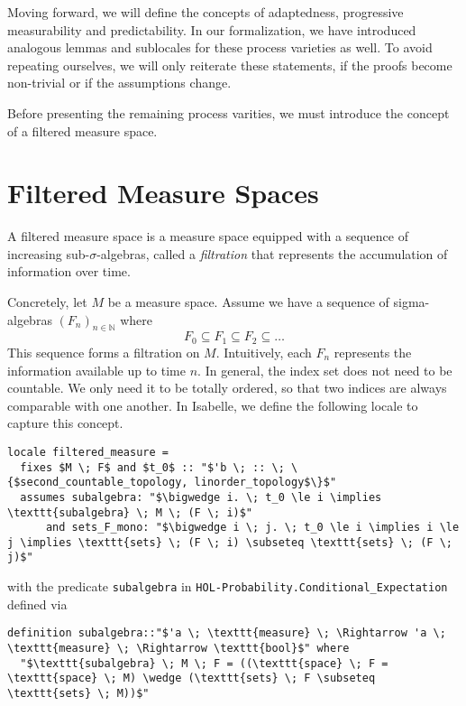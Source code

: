 \begin{remark}
Moving forward, we will define the concepts of adaptedness, progressive measurability and predictability. In our formalization, we have introduced analogous lemmas and sublocales for these process varieties as well. To avoid repeating ourselves, we will only reiterate these statements, if the proofs become non-trivial or if the assumptions change.
\end{remark}

Before presenting the remaining process varities, we must introduce the concept of a filtered measure space.

\section{Filtered Measure Spaces}

A filtered measure space is a measure space equipped with a sequence of increasing sub-$\sigma$-algebras, called a \textit{filtration} that represents the accumulation of information over time.

Concretely, let $M$ be a measure space. Assume we have a sequence of sigma-algebras $(F_n)_{n \in \mathbb{N}}$ where 
\[
	F_0 \subseteq F_1 \subseteq F_2 \subseteq \dots
\]
This sequence forms a filtration on $M$. Intuitively, each $F_n$ represents the information available up to time $n$. In general, the index set does not need to be countable. We only need it to be totally ordered, so that two indices are always comparable with one another. In Isabelle, we define the following locale to capture this concept.

\begin{isadefinition}
{\small
\begin{lstlisting}[style=isabelle]
locale filtered_measure = 
  fixes $M \; F$ and $t_0$ :: "$'b \; :: \; \{$second_countable_topology, linorder_topology$\}$"
  assumes subalgebra: "$\bigwedge i. \; t_0 \le i \implies \texttt{subalgebra} \; M \; (F \; i)$"
      and sets_F_mono: "$\bigwedge i \; j. \; t_0 \le i \implies i \le j \implies \texttt{sets} \; (F \; i) \subseteq \texttt{sets} \; (F \; j)$"
\end{lstlisting}

with the predicate \texttt{subalgebra} in \texttt{HOL-Probability.Conditional\_Expectation} defined via

\begin{lstlisting}[style=isabelle]
definition subalgebra::"$'a \; \texttt{measure} \; \Rightarrow 'a \; \texttt{measure} \; \Rightarrow \texttt{bool}$" where
  "$\texttt{subalgebra} \; M \; F = ((\texttt{space} \; F = \texttt{space} \; M) \wedge (\texttt{sets} \; F \subseteq \texttt{sets} \; M))$"
  \end{lstlisting}
}
\end{isadefinition}

